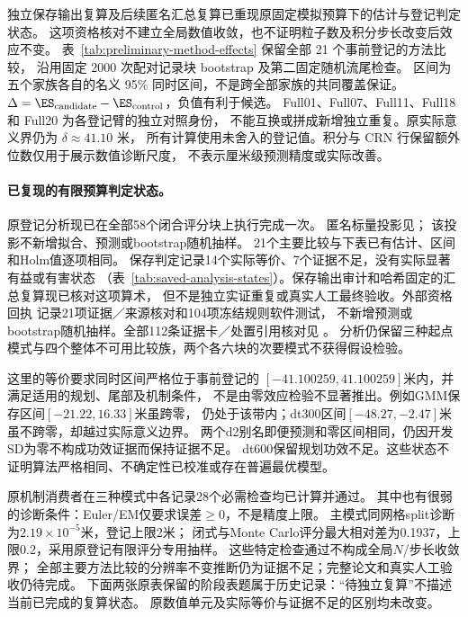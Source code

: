独立保存输出复算及后续匿名汇总复算已重现原固定模拟预算下的估计与登记判定状态。
这项资格核对不建立全局数值收敛，也不证明粒子数及积分步长改变后效应不变。
表~\ref{tab:preliminary-method-effects} 保留全部 21 个事前登记的方法比较，
沿用固定 2000 次配对记录块 bootstrap 及第二固定随机流尾检查。
区间为五个家族各自的名义 95\% 同时区间，不是跨全部家族的共同覆盖保证。
$\Delta=\ES_{\mathrm{candidate}}-\ES_{\mathrm{control}}$，负值有利于候选。
Full01、Full07、Full11、Full18 和 Full20 为各登记臂的独立对照身份，
不能互换或拼成新增独立重复。原实际意义界仍为 $\delta\approx41.10$ 米，
所有计算使用未舍入的登记值。积分与 CRN 行保留额外位数仅用于展示数值诊断尺度，
不表示厘米级预测精度或实际改善。

\paragraph{已复现的有限预算判定状态。}
\label{sec:saved-analysis-status}\hypertarget{sec:saved-analysis-status}{}
原登记分析现已在全部58个闭合评分块上执行完成一次。
匿名标量投影见；
该投影不新增拟合、预测或bootstrap随机抽样。
21个主要比较与下表已有估计、区间和Holm值逐项相同。
保存判定记录14个实际等价、7个证据不足，没有实际显著有益或有害状态
（表~\ref{tab:saved-analysis-states}）。保存输出审计和哈希固定的汇总复算现已核对这项算术，
但不是独立实证重复或真实人工最终验收。外部资格回执
记录21项证据／来源核对和104项冻结规则软件测试，
不新增预测或bootstrap随机抽样。全部112条证据卡／处置引用核对见
。
分析仍保留三种起点模式与四个整体不可用比较族，两个各六块的次要模式不获得假设检验。

这里的等价要求同时区间严格位于事前登记的
$[-41.100259,41.100259]$米内，并满足适用的规划、尾部及机制条件，
不是由零效应检验不显著推出。例如GMM保存区间$[-21.22,16.33]$米虽跨零，
仍处于该带内；dt300区间$[-48.27,-2.47]$米虽不跨零，却越过实际意义边界。
两个d2别名即便预测和零区间相同，仍因开发SD为零不构成功效证据而保持证据不足。
dt600保留规划功效不足。这些状态不证明算法严格相同、不确定性已校准或存在普遍最优模型。

原机制消费者在三种模式中各记录28个必需检查均已计算并通过。
其中也有很弱的诊断条件：Euler/EM仅要求误差$\geq0$，不是精度上限。
主模式同网格split诊断为$2.19\times10^{-5}$米，登记上限2米；
闭式与Monte Carlo评分最大相对差为0.1937，上限0.2，采用原登记有限评分专用抽样。
这些特定检查通过不构成全局$N$/步长收敛界；
全部主要方法比较的分辨率不变推断仍为证据不足；完整论文和真实人工验收仍待完成。
下面两张原表保留的阶段表题属于历史记录：“待独立复算”不描述当前已完成的复算状态。
原数值单元及实际等价与证据不足的区别均未改变。

